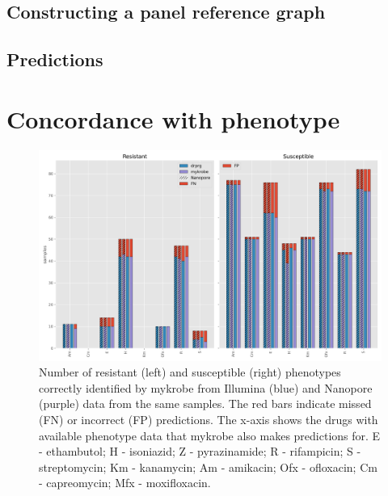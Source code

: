 \subsection{Constructing a panel reference graph}

\subsection{Predictions}

\section{Concordance with phenotype}

\begin{figure}
\begin{center}
\includegraphics[width=0.90\columnwidth]{Chapter3/Figs/phenotype_concordance.png}
\caption{{Number of resistant (left) and susceptible (right) phenotypes correctly identified by mykrobe from Illumina (blue) and Nanopore (purple) data from the same samples. The red bars indicate missed (FN) or incorrect (FP) predictions. The x-axis shows the drugs with available phenotype data that mykrobe also makes predictions for. E - ethambutol; H - isoniazid; Z - pyrazinamide; R - rifampicin; S - streptomycin; Km - kanamycin; Am - amikacin; Ofx - ofloxacin; Cm - capreomycin; Mfx - moxifloxacin.
{\label{fig:pheno-concordance}}
}}
\end{center}
\end{figure}

